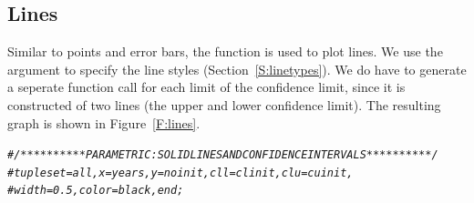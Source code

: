 \documentclass[nojss, letterpaper]{jss}\usepackage[]{graphicx}\usepackage[]{color}
\makeatletter
\newcommand{\hlcom}[1]{\textcolor[rgb]{0.678,0.584,0.686}{\textit{#1}}}%
\newenvironment{kframe}{%
 \def\at@end@of@kframe{}%
 \ifinner\ifhmode%
  \def\at@end@of@kframe{\end{minipage}}%
  \begin{minipage}{\columnwidth}%
 \fi\fi%
 \def\FrameCommand##1{\hskip\@totalleftmargin \hskip-\fboxsep
 \colorbox{shadecolor}{##1}\hskip-\fboxsep
     \hskip-\linewidth \hskip-\@totalleftmargin \hskip\columnwidth}%
 \MakeFramed {\advance\hsize-\width
   \@totalleftmargin\z@ \linewidth\hsize
   \@setminipage}}%
 {\par\unskip\endMakeFramed%
 \at@end@of@kframe}
\newenvironment{knitrout}{}{} %
\makeatother
\begin{document}
\subsection{Lines}\label{S:lines}
Similar to points and error bars, the  function is used to plot lines. We use the  argument to specify the line styles (Section~\ref{S:linetypes}). We do have to generate a seperate  function call for each limit of the confidence limit, since it is constructed of two lines (the upper and lower confidence limit). The resulting graph is shown in Figure~\ref{F:lines}.
\begin{knitrout}\footnotesize
{}\color{fgcolor}\begin{kframe}
\begin{alltt}
\hlcom{# /**********PARAMETRIC : SOLID LINES AND CONFIDENCE INTERVALS**********/      }
\hlcom{# tuple set=all, x=years, y=noinit, cll=clinit, clu=cuinit,}
\hlcom{# width=0.5,color=black, end;}


\end{alltt}
\end{kframe}
\end{knitrout}
\end{document}
